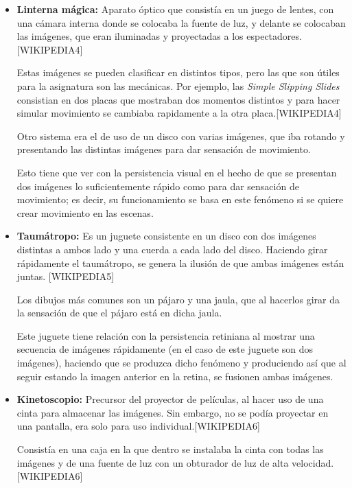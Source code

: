 \documentclass{article}
\begin{document}
\begin{itemize}
    \item \textbf{Linterna mágica: }Aparato óptico que consistía en un juego de lentes, con una cámara interna donde se colocaba la fuente de luz, y delante se colocaban las imágenes, que eran iluminadas y proyectadas a los espectadores. [WIKIPEDIA4] 
    
    Estas imágenes se pueden clasificar en distintos tipos, pero las que son útiles para la asignatura son las mecánicas. Por ejemplo, las \textit{Simple Slipping Slides} consistian en dos placas que mostraban dos momentos distintos y para hacer simular movimiento se cambiaba rapidamente a la otra placa.[WIKIPEDIA4]

    Otro sistema era el de uso de un disco con varias imágenes, que iba rotando y presentando las distintas imágenes para dar sensación de movimiento.

    Esto tiene que ver con la persistencia visual en el hecho de que se presentan dos imágenes lo suficientemente rápido como para dar sensación de movimiento; es decir, su funcionamiento se basa en este fenómeno si se quiere crear movimiento en las escenas.

    \item \textbf{Taumátropo: }Es un juguete consistente en un disco con dos imágenes distintas a ambos lado y una cuerda a cada lado del disco. Haciendo girar rápidamente el taumátropo, se genera la ilusión de que ambas imágenes están juntas. [WIKIPEDIA5]
    
    Los dibujos más comunes son un pájaro y una jaula, que al hacerlos girar da la sensación de que el pájaro está en dicha jaula.

    Este juguete tiene relación con la persistencia retiniana al mostrar una secuencia de imágenes rápidamente (en el caso de este juguete son dos imágenes), haciendo que se produzca dicho fenómeno y produciendo así que al seguir estando la imagen anterior en la retina, se fusionen ambas imágenes.

    \item \textbf{Kinetoscopio: }Precursor del proyector de películas, al hacer uso de una cinta para almacenar las imágenes. Sin embargo, no se podía proyectar en una pantalla, era solo para uso individual.[WIKIPEDIA6]
    
    Consistía en una caja en la que dentro se instalaba la cinta con todas las imágenes y de una fuente de luz con un obturador de luz de alta velocidad.[WIKIPEDIA6]


\end{itemize}
\end{document}
